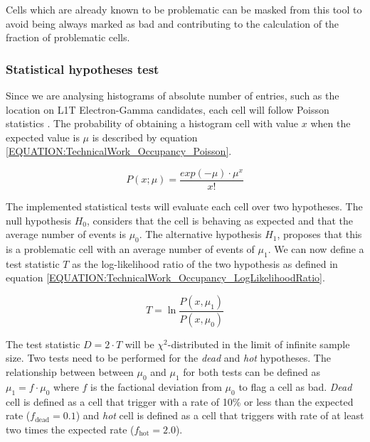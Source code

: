 Cells which are already known to be problematic can be masked from this tool to avoid being always marked as bad and contributing to the calculation of the fraction of problematic cells.

\subsubsection{Statistical hypotheses test}


Since we are analysing histograms of absolute number of entries, such as the location on \gls{L1T} Electron-Gamma candidates, each cell will follow Poisson statistics \cite{BOOK:AppliedStatisticsAndProbabilityforEngineers}. The probability of obtaining a histogram cell with value $x$ when the expected value is $\mu$ is described by equation \ref{EQUATION:TechnicalWork_Occupancy_Poisson}.

\begin{equation}
P(x;\mu)=\frac{exp(-\mu) \cdot \mu^{x}}{x!}
\label{EQUATION:TechnicalWork_Occupancy_Poisson}
\end{equation}

The implemented statistical tests will evaluate each cell over two hypotheses. The null hypothesis $H_0$, considers that the cell is behaving as expected and that the average number of events is $\mu_0$. The alternative hypothesis $H_1$, proposes that this is a problematic cell with an average number of events of $\mu_1$. We can now define a test statistic $T$ as the log-likelihood ratio of the two hypothesis as defined in equation \ref{EQUATION:TechnicalWork_Occupancy_LogLikelihoodRatio}.

\begin{equation}
T=\ln\frac{P(x,\mu_1)}{P(x,\mu_0)}
\label{EQUATION:TechnicalWork_Occupancy_LogLikelihoodRatio}
\end{equation}

The test statistic $D=2 \cdot T$ will be $\chi^2$-distributed in the limit of infinite sample size. Two tests need to be performed for the \textit{dead} and \textit{hot} hypotheses. The relationship between between $\mu_0$ and $\mu_1$ for both tests can be defined as $\mu_1=f \cdot \mu_0$ where $f$ is the factional deviation from $\mu_0$ to flag a cell as bad. \textit{Dead} cell is defined as a cell that trigger with a rate of 10\% or less than the expected rate ($f_{\text{dead}}=0.1$) and \textit{hot} cell is defined as a cell that triggers with rate of at least two times the expected rate ($f_{\text{hot}}=2.0$).

